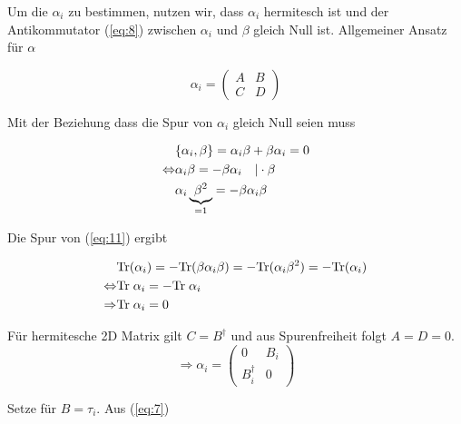 Um die \(\alpha_i\) zu bestimmen, nutzen wir, dass \(\alpha_i\) hermitesch ist und der Antikommutator (\ref{eq:8}) zwischen \(\alpha_i\) und \(\beta\) gleich Null ist. Allgemeiner Ansatz für \(\alpha\)


\begin{equation}
  \label{eq:10}
  \alpha_i =\begin{pmatrix}A&B\\ C&D\end{pmatrix}
\end{equation}

Mit der Beziehung dass die Spur von \(\alpha_i\) gleich Null seien muss

\begin{align}
   \label{eq:11}
   &\{\alpha_i,\beta\} =  \alpha_i\beta + \beta\alpha_i=0 \notag\\
   \Leftrightarrow &\alpha_i\beta =-\beta\alpha_i \quad |\cdot \beta\notag\\
   &\alpha_i\underbrace{\beta^2}_{=1}=-\beta\alpha_i\beta
\end{align}

Die Spur von (\ref{eq:11}) ergibt

\begin{align}
  \label{eq:12}
  &\text{Tr}(\alpha_i)=-\text{Tr}(\beta\alpha_i\beta)=-\text{Tr}(\alpha_i\beta^2)
  =-\text{Tr}(\alpha_i)\notag\\
  \Leftrightarrow&\text{Tr}\;\alpha_i = -\text{Tr}\;\alpha_i\notag\\ 
  \Rightarrow &\text{Tr}\;\alpha_i=0
\end{align}

Für hermitesche 2D Matrix gilt \(C=B^\dagger\)  und aus Spurenfreiheit folgt \(A=D=0\). 
\begin{equation}
  \label{eq:13}
  \Rightarrow \alpha_i =\begin{pmatrix}0&B_i\\ B^\dagger_i&0\end{pmatrix}
\end{equation}


Setze für \(B=\tau_i\). Aus (\ref{eq:7})



